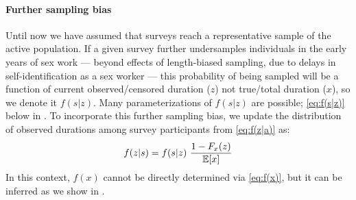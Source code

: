 \paragraph{Further sampling bias}
Until now we have assumed that surveys reach
a representative sample of the active population.
If a given survey further undersamples individuals in the early years of sex work
--- \ie beyond effects of length-biased sampling,
due to delays in self-identification as a sex worker \cite{Cheuk2020} ---
this probability of being sampled will be a function of
current observed/censored duration ($z$) not true/total duration ($x$),
so we denote it $f(s|z)$.
Many parameterizations of $f(s|z)$ are possible;
\eg \eqref{eq:f(s|z)} below in .
To incorporate this further sampling bias, we update
the distribution of observed durations among survey participants
from \eqref{eq:f(z|a)} as:
\begin{equation}
  f(z|s) = f(s|z) ~ \frac{1 - F_x(z)}{\mathbb{E}[x]}
  \label{eq:f(z|s)}
\end{equation}
In this context, $f(x)$ cannot be directly determined via \eqref{eq:f(x)},
but it can be inferred as we show in .
